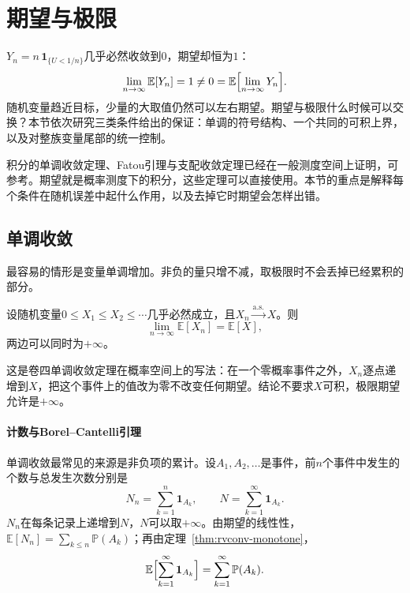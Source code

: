 \section{期望与极限}
\label{sec:rvconv-expectation-limits}

$Y_n=n\,\mathbf{1}_{\{U<1/n\}}$几乎必然收敛到$0$，期望却恒为$1$：
\[
 \lim_{n\to\infty}\mathbb{E}[Y_n]=1\neq0=\mathbb{E}\Bigl[\lim_{n\to\infty}Y_n\Bigr] .
\]
随机变量趋近目标，少量的大取值仍然可以左右期望。期望与极限什么时候可以交换？本节依次研究三类条件给出的保证：单调的符号结构、一个共同的可积上界，以及对整族变量尾部的统一控制。

积分的单调收敛定理、Fatou引理与支配收敛定理已经在一般测度空间上证明，可参考。期望就是概率测度下的积分，这些定理可以直接使用。本节的重点是解释每个条件在随机误差中起什么作用，以及去掉它时期望会怎样出错。

\subsection{单调收敛}
\label{sec:rvconv-monotone}

最容易的情形是变量单调增加。非负的量只增不减，取极限时不会丢掉已经累积的部分。

\begin{theorem}[单调收敛定理]
\label{thm:rvconv-monotone}
设随机变量$0\leq X_1\leq X_2\leq\cdots$几乎必然成立，且$X_n\xrightarrow{\mathrm{a.s.}}X$。则
\begin{equation}
 \lim_{n\to\infty}\mathbb{E}[X_n]=\mathbb{E}[X] ,
 \label{eq:rvconv-monotone}
\end{equation}
两边可以同时为$+\infty$。
\end{theorem}

这是卷四单调收敛定理在概率空间上的写法：在一个零概率事件之外，$X_n$逐点递增到$X$，把这个事件上的值改为零不改变任何期望。结论不要求$X$可积，极限期望允许是$+\infty$。

\paragraph{计数与Borel–Cantelli引理}
单调收敛最常见的来源是非负项的累计。设$A_1,A_2,\dots$是事件，前$n$个事件中发生的个数与总发生次数分别是
\[
 N_n=\sum_{k=1}^{n}\mathbf{1}_{A_k},\qquad N=\sum_{k=1}^{\infty}\mathbf{1}_{A_k} .
\]
$N_n$在每条记录上递增到$N$，$N$可以取$+\infty$。由期望的线性性，$\mathbb{E}[N_n]=\sum_{k\leq n}\mathbb{P}(A_k)$；再由定理~\ref{thm:rvconv-monotone}，
\begin{equation}
 \mathbb{E}\Bigl[\sum_{k=1}^{\infty}\mathbf{1}_{A_k}\Bigr]=\sum_{k=1}^{\infty}\mathbb{P}(A_k) .
 \label{eq:rvconv-count-mean}
\end{equation}

